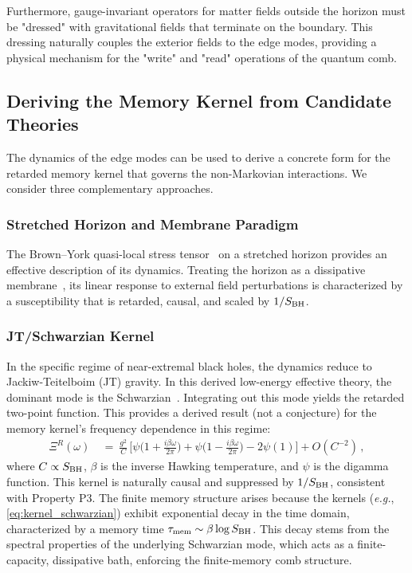 \documentclass[11pt,a4paper]{article}
\newcommand{\eg}{\textit{e.g.}\xspace}
\theoremstyle{plain}
\theoremstyle{definition}
\theoremstyle{remark}
\begin{document}
Furthermore, gauge-invariant operators for matter fields outside the horizon must be "dressed" with gravitational fields that terminate on the boundary. This dressing naturally couples the exterior fields to the edge modes, providing a physical mechanism for the "write" and "read" operations of the quantum comb.

\subsection{Deriving the Memory Kernel from Candidate Theories}
\label{sec:derive_qg}
The dynamics of the edge modes can be used to derive a concrete form for the retarded memory kernel that governs the non-Markovian interactions. We consider three complementary approaches.

\subsubsection{Stretched Horizon and Membrane Paradigm} The Brown--York quasi-local stress tensor~\cite{BrownYork:1993, Iyer:1994} on a stretched horizon provides an effective description of its dynamics. Treating the horizon as a dissipative membrane~\cite{Thorne:1986}, its linear response to external field perturbations is characterized by a susceptibility that is retarded, causal, and scaled by $1/S_{\rm BH}$.

\subsubsection{JT/Schwarzian Kernel} In the specific regime of near-extremal black holes, the dynamics reduce to Jackiw-Teitelboim (JT) gravity. In this derived low-energy effective theory, the dominant mode is the Schwarzian~\cite{MSY:2016, Jensen:2016}. Integrating out this mode yields the retarded two-point function. This provides a derived result (not a conjecture) for the memory kernel's frequency dependence in this regime:
\begin{align}
\Xi^R(\omega)\ &=\ \frac{g^2}{C}\,\Big[\psi\!\Big(1+\frac{i \beta \omega}{2\pi}\Big)+\psi\!\Big(1-\frac{i \beta \omega}{2\pi}\Big) - 2\psi(1)\Big] + O(C^{-2})\,,
\label{eq:kernel_schwarzian}
\end{align}
where $C \propto S_{\rm BH}$, $\beta$ is the inverse Hawking temperature, and $\psi$ is the digamma function. This kernel is naturally causal and suppressed by $1/S_{\rm BH}$, consistent with Property P3.
The finite memory structure arises because the kernels (\eg, \eqref{eq:kernel_schwarzian}) exhibit exponential decay in the time domain, characterized by a memory time $\tau_{\rm mem} \sim \beta \log S_{\rm BH}$. This decay stems from the spectral properties of the underlying Schwarzian mode, which acts as a finite-capacity, dissipative bath, enforcing the finite-memory comb structure.
\end{document}
